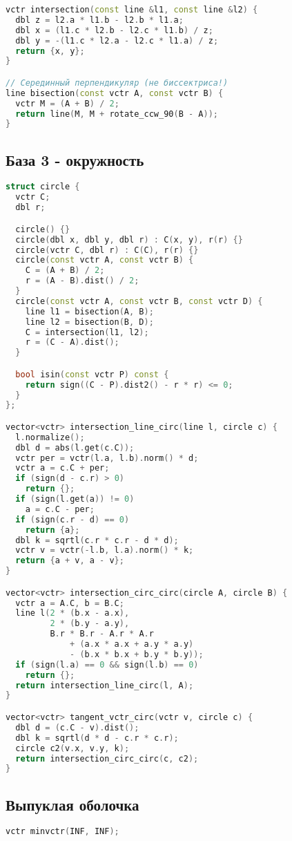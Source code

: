 \documentclass[9pt,a4paper,landscape,twosided]{extarticle}
\begin{document}
\begin{multicols*}{3}
\begin{lstlisting}[language=C++]
vctr intersection(const line &l1, const line &l2) {
  dbl z = l2.a * l1.b - l2.b * l1.a;
  dbl x = (l1.c * l2.b - l2.c * l1.b) / z;
  dbl y = -(l1.c * l2.a - l2.c * l1.a) / z;
  return {x, y};
}

// Серединный перпендикуляр (не биссектриса!)
line bisection(const vctr A, const vctr B) {
  vctr M = (A + B) / 2;
  return line(M, M + rotate_ccw_90(B - A));
}

\end{lstlisting}

\subsection{База 3 - окружность}
\begin{lstlisting}[language=C++]
struct circle {
  vctr C;
  dbl r;

  circle() {}
  circle(dbl x, dbl y, dbl r) : C(x, y), r(r) {}
  circle(vctr C, dbl r) : C(C), r(r) {}
  circle(const vctr A, const vctr B) {
    C = (A + B) / 2;
    r = (A - B).dist() / 2;
  }
  circle(const vctr A, const vctr B, const vctr D) {
    line l1 = bisection(A, B);
    line l2 = bisection(B, D);
    C = intersection(l1, l2);
    r = (C - A).dist();
  }

  bool isin(const vctr P) const {
    return sign((C - P).dist2() - r * r) <= 0;
  }
};

vector<vctr> intersection_line_circ(line l, circle c) {
  l.normalize();
  dbl d = abs(l.get(c.C));
  vctr per = vctr(l.a, l.b).norm() * d;
  vctr a = c.C + per;
  if (sign(d - c.r) > 0)
    return {};
  if (sign(l.get(a)) != 0)
    a = c.C - per;
  if (sign(c.r - d) == 0)
    return {a};
  dbl k = sqrtl(c.r * c.r - d * d);
  vctr v = vctr(-l.b, l.a).norm() * k;
  return {a + v, a - v};
}

vector<vctr> intersection_circ_circ(circle A, circle B) {
  vctr a = A.C, b = B.C;
  line l(2 * (b.x - a.x),
         2 * (b.y - a.y),
         B.r * B.r - A.r * A.r
             + (a.x * a.x + a.y * a.y)
             - (b.x * b.x + b.y * b.y));
  if (sign(l.a) == 0 && sign(l.b) == 0)
    return {};
  return intersection_line_circ(l, A);
}

vector<vctr> tangent_vctr_circ(vctr v, circle c) {
  dbl d = (c.C - v).dist();
  dbl k = sqrtl(d * d - c.r * c.r);
  circle c2(v.x, v.y, k);
  return intersection_circ_circ(c, c2);
}

\end{lstlisting}

\subsection{Выпуклая оболочка}
\begin{lstlisting}[language=C++]
vctr minvctr(INF, INF);


\end{lstlisting}
\end{multicols*}
\end{document}
